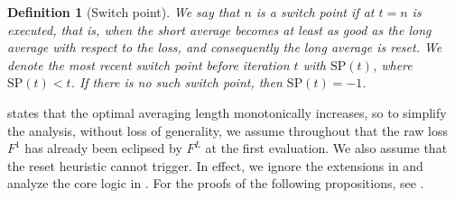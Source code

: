 \documentclass[twocolumn]{article}
\newcommand*{\SP}{\mathrm{SP}}
\newtheorem{definition}{Definition}
\begin{document}
\begin{definition}[Switch point]
We say that $n$ is a switch point if at $t=n$  is executed, that is, when the short average becomes at least as good as the long average with respect to the loss, and consequently the long average is reset.
We denote the most recent switch point before iteration $t$ with $\SP(t)$, where $\SP(t) < t$.
If there is no such switch point, then $\SP(t)=-1$.
\end{definition}

 states that the optimal averaging length monotonically increases, so to simplify the analysis, without loss of generality, we assume throughout that the raw loss $F^1$ has already been eclipsed by $F^L$ at the first evaluation.
We also assume that the reset heuristic cannot trigger.
In effect, we ignore the extensions in  and analyze the core logic in .
For the proofs of the following propositions, see .
\end{document}
